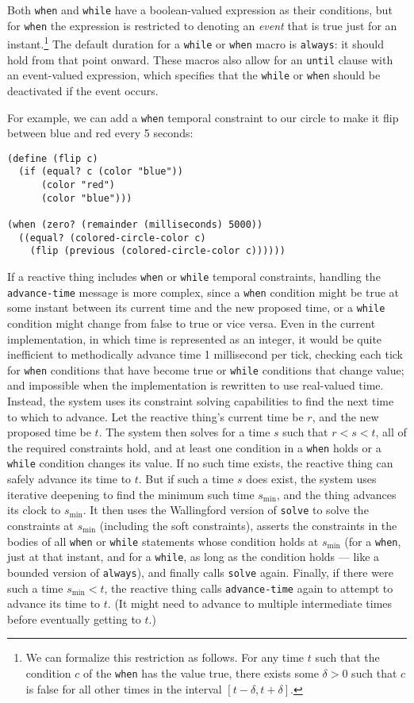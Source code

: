 \documentclass{sigplanconf}
\begin{document}
Both \verb|when| and \verb|while| have a boolean-valued expression as their
conditions, but for \verb|when| the expression is restricted to denoting an
\emph{event} that is true just for an instant.\footnote{We can formalize
  this restriction as follows.  For any time $t$ such that the condition
  $c$ of the {\tt when} has the value true, there exists some $\delta>0$
  such that $c$ is false for all other times in the interval
  $[t-\delta,t+\delta]$.}  The default duration for a \verb|while| or
\verb|when| macro is \verb|always|: it should hold from that point onward.
These macros also allow for an \verb|until| clause with an event-valued
expression, which specifies that the \verb|while| or \verb|when| should be
deactivated if the event occurs.

For example, we can add a \verb|when| temporal constraint to our 
circle to make it flip between blue and red every 5 seconds:

\begin{verbatim}
(define (flip c)
  (if (equal? c (color "blue"))
      (color "red")
      (color "blue")))

(when (zero? (remainder (milliseconds) 5000))
  ((equal? (colored-circle-color c) 
    (flip (previous (colored-circle-color c))))))
\end{verbatim}

If a reactive thing includes \verb|when| or \verb|while| temporal
constraints, handling the \verb|advance-time| message is more complex,
since a \verb|when| condition might be true at some instant between
its current time and the new proposed time, or a \verb|while|
condition might change from false to true or vice versa.  Even in the
current implementation, in which time is represented as an integer, it
would be quite inefficient to methodically advance time 1 millisecond
per tick, checking each tick for \verb|when| conditions that have
become true or \verb|while| conditions that change value; and
impossible when the implementation is rewritten to use real-valued
time.  Instead, the system uses its constraint solving capabilities to
find the next time to which to advance.  Let the reactive thing's
current time be $r$, and the new proposed time be $t$\@.  The system
then solves for a time $s$ such that $r<s<t$, all of the required
constraints hold, and at least one condition in a \verb|when| holds or
a \verb|while| condition changes its value.  If no such time exists,
the reactive thing can safely advance its time to $t$\@.  But if such
a time $s$ does exist, the system uses iterative deepening to find the
minimum such time $s_{\min}$, and the thing advances its clock to
$s_{\min}$.  It then uses the Wallingford version of \verb|solve| to
solve the constraints at $s_{\min}$ (including the soft constraints),
asserts the constraints in the bodies of all \verb|when| or
\verb|while| statements whose condition holds at $s_{\min}$ (for a
\verb|when|, just at that instant, and for a \verb|while|, as long as
the condition holds --- like a bounded version of \verb|always|), and
finally calls \verb|solve| again.  Finally, if there were such a time
$s_{\min}<t$, the reactive thing calls \verb|advance-time| again to
attempt to advance its time to $t$\@.  (It might need to advance to
multiple intermediate times before eventually getting to $t$.)
\end{document}
